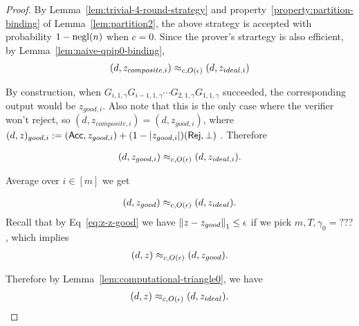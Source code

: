 \begin{proof}
By Lemma~\ref{lem:trivial-4-round-strategy} and property~\ref{property:partition-binding} of Lemma~\ref{lem:partition2}, the above strategy is accepted with probability $1-\operatorname{negl}(n)$ when $c=0$. Since the prover's strartegy is also efficient, by Lemma~\ref{lem:naive-qpip0-binding}, 
\begin{align}
    (d,z_{composite,i})\approx_{c, O(\epsilon)}(d,z_{ideal,i})
\end{align}



By construction, when $G_{i,1,\gamma}G_{i-1,1,\gamma} \cdots G_{2,1,\gamma}G_{1,1,\gamma}$ succeeded, the corresponding output would be $z_{good,i}$. Also note that this is the only case where the verifier won't reject, so $(d,z_{composite,i})=(d,z_{good,i})$, where  $(d,z)_{good,i} := (\mathsf{Acc}, z_{good,i}) + (1-|z_{good,i}|)(\mathsf{Rej},\bot)$  . Therefore

\begin{align}
    (d,z_{good,i})\approx_{c, O(\epsilon)}(d,z_{ideal,i}).
\end{align}

Average over $i\in[m]$ we get

\begin{align}
    (d,z_{good})\approx_{c, O(\epsilon)}(d,z_{ideal}).
\end{align}
Recall that by Eq~\ref{eq:z-z-good} we have $\left\lVert z-z_{good}\right\rVert_1 \leq \epsilon$ if we pick $m,T,\gamma_0=???$ , which implies 
\begin{align}
    (d,z)\approx_{c, O(\epsilon)}(d,z_{good}).
\end{align}

Therefore by Lemma~\ref{lem:computational-triangle0}, we have  
\begin{align}
     (d,z)\approx_{c, O(\epsilon)}(d,z_{ideal}).
\end{align}

 
\end{proof}





